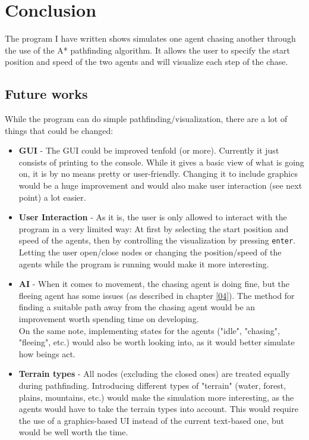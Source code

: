 \section{Conclusion}
\label{05}

The program I have written shows simulates one agent chasing another through the use of the A* pathfinding algorithm. It allows the user to specify the start position and speed of the two agents and will visualize each step of the chase.

\subsection{Future works}
\label{05_01}

While the program can do simple pathfinding/visualization, there are a lot of things that could be changed:

\begin{itemize}

	\item \textbf{GUI} - The GUI could be improved tenfold (or more). Currently it just consists of printing to the console. While it gives a basic view of what is going on, it is by no means pretty or user-friendly. Changing it to include graphics would be a huge improvement and would also make user interaction (see next point) a lot easier.

	\item \textbf{User Interaction} - As it is, the user is only allowed to interact with the program in a very limited way: At first by selecting the start position and speed of the agents, then by controlling the visualization by pressing \texttt{enter}. Letting the user open/close nodes or changing the position/speed of the agents while the program is running would make it more interesting.

	\item \textbf{AI} - When it comes to movement, the chasing agent is doing fine, but the fleeing agent has some issues (as described in chapter \ref{04}). The method for finding a suitable path away from the chasing agent would be an improvement worth spending time on developing.
	\\ On the same note, implementing states for the agents ("idle", "chasing", "fleeing", etc.) would also be worth looking into, as it would better simulate how beings act.

	\item \textbf{Terrain types} - All nodes (excluding the closed ones) are treated equally during pathfinding. Introducing different types of "terrain" (water, forest, plains, mountains, etc.) would make the simulation more interesting, as the agents would have to take the terrain types into account. This would require the use of a graphics-based UI instead of the current text-based one, but would be well worth the time.

\end{itemize}